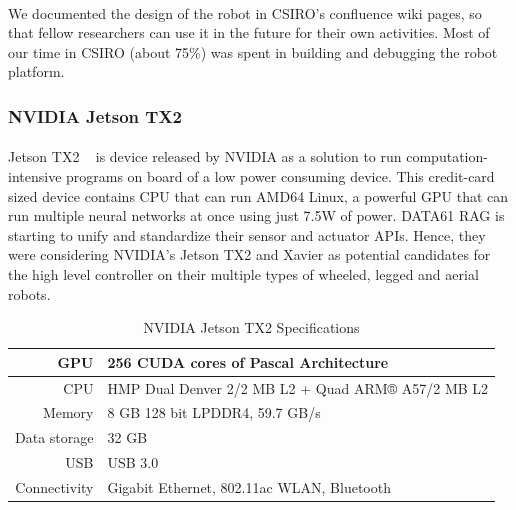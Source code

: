 \paragraph{}
We documented the design of the robot in CSIRO's confluence wiki pages, so that fellow researchers can use it in the future for their own activities. Most of our time in CSIRO (about 75\%) was spent in building and debugging the robot platform. 


\subsubsection{NVIDIA Jetson TX2}

\paragraph{}
Jetson TX2 ~\cite{jetson_tx2} is device released by NVIDIA as a solution to run computation-intensive programs on board of a low power consuming device. This credit-card sized device contains CPU that can run AMD64 Linux, a powerful GPU that can run multiple neural networks at once using just 7.5W of power. DATA61 RAG is starting to unify and standardize their sensor and actuator APIs. Hence, they were considering NVIDIA's Jetson TX2 and Xavier as potential candidates for the high level controller on their multiple types of wheeled, legged and aerial robots.



\begin{table}[H]
    \begin{center}
        \caption {NVIDIA Jetson TX2 Specifications} \label{tab:jetson}
        \begin{tabular}{|| r || l ||}    
            \hline
            GPU             & 256 CUDA cores of Pascal Architecture \\
            \hline
            CPU             & HMP Dual Denver 2/2 MB L2 + Quad ARM® A57/2 MB L2 \\
            \hline
            Memory          & 8 GB 128 bit LPDDR4, 59.7 GB/s \\
            \hline
            Data storage    & 32 GB \\
            \hline 
            USB             & USB 3.0 \\
            \hline 
            Connectivity    & Gigabit Ethernet, 802.11ac WLAN, Bluetooth \\
            \hline   
        \end{tabular}    
    \end{center}
\end{table}

